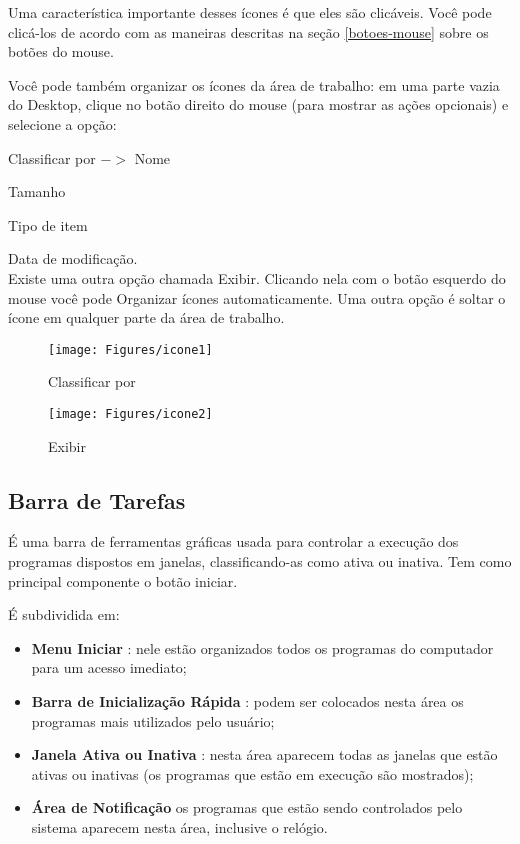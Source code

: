 \documentclass[hidelinks,12pt]{article}
\begin{document}
    Uma característica importante desses ícones é que eles são clicáveis. Você pode clicá-los de acordo com as maneiras descritas na seção \ref{botoes-mouse} sobre os botões do mouse. 
    
    Você pode também organizar os ícones da área de trabalho: em uma parte vazia do Desktop, clique no botão direito do mouse (para mostrar as ações opcionais) e selecione a opção:

	Classificar por $->$ Nome

	 \hspace{3.6cm}Tamanho

	 \hspace{3.6cm}Tipo de item

	 \hspace{3.6cm}Data de modificação.\\

	 Existe uma outra opção chamada Exibir. Clicando nela com o botão esquerdo do mouse você pode Organizar ícones automaticamente. Uma outra opção é soltar o ícone em qualquer parte da área de trabalho.


	\begin{figure}[!htbp]
		\centering
		\begin{minipage}[b]{0.45\textwidth}
			\texttt{[image: Figures/icone1]}
			\caption{Classificar por}
			\label{fig:classificar por}
		\end{minipage}
		\hfill
		\begin{minipage}[b]{0.53\textwidth}
			\texttt{[image: Figures/icone2]}
			\caption{Exibir}
			\label{fig:exibir}
		\end{minipage}
	\end{figure}

\subsection{Barra de Tarefas}

	É uma barra de ferramentas gráficas usada para controlar a execução dos programas dispostos em janelas, classificando-as como ativa ou inativa. Tem como principal componente o botão iniciar.

	É subdividida em:

\begin{itemize}
	\item \textbf{Menu Iniciar} : nele estão organizados todos os programas do computador para um acesso imediato;

	\item \textbf{Barra de Inicialização Rápida} : podem ser colocados nesta área os programas mais utilizados pelo usuário;

	\item \textbf{Janela Ativa ou Inativa} : nesta área aparecem todas as janelas que estão ativas ou inativas (os programas que estão em execução são mostrados);

	\item \textbf{Área de Notificação} os programas que estão sendo controlados pelo sistema aparecem nesta área, inclusive o relógio.

\end{itemize}
\end{document}
